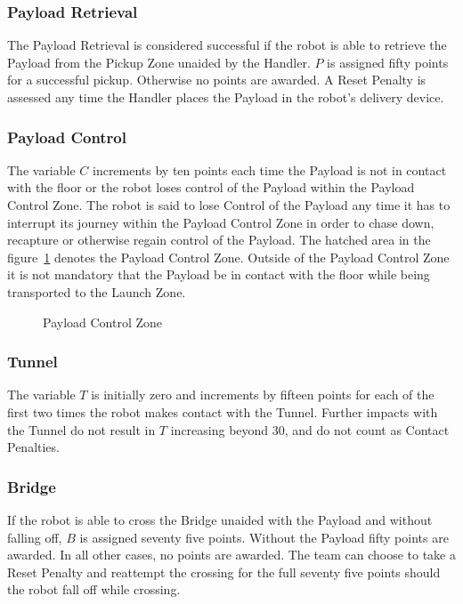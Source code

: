 \subsubsection{Payload Retrieval}
The Payload Retrieval is considered successful if the robot is able to retrieve the Payload from the Pickup Zone unaided by the Handler. $P$ is assigned fifty points for a successful pickup. Otherwise no points are awarded. A Reset Penalty is assessed any time the Handler places the Payload in the robot’s delivery device. 

\subsubsection{Payload Control}
The variable $C$ increments by ten points each time the Payload is not in contact with the floor or the robot loses control of the Payload within the Payload Control Zone. The robot is said to lose Control of the Payload any time it has to interrupt its journey within the Payload Control Zone in order to chase down, recapture or otherwise regain control of the Payload. The hatched area in the figure~\ref{fig:control_zone} denotes the Payload Control Zone. Outside of the Payload Control Zone it is not mandatory that the Payload be in contact with the floor while being transported to the Launch Zone.


\begin{figure}[H]
	\centering
	\caption{Payload Control Zone}
	\label{fig:control_zone} 
\end{figure}

\subsubsection{Tunnel}
The variable $T$ is initially zero and increments by fifteen points for each of the first two times the robot makes contact with the Tunnel. Further impacts with the Tunnel do not result in $T$ increasing beyond 30, and do not count as Contact Penalties.

\subsubsection{Bridge}
If the robot is able to cross the Bridge unaided with the Payload and without falling off, $B$ is assigned seventy five points. Without the Payload fifty points are awarded. In all other cases, no points are awarded. The team can choose to take a Reset Penalty and reattempt the crossing for the full seventy five points should the robot fall off while crossing.

